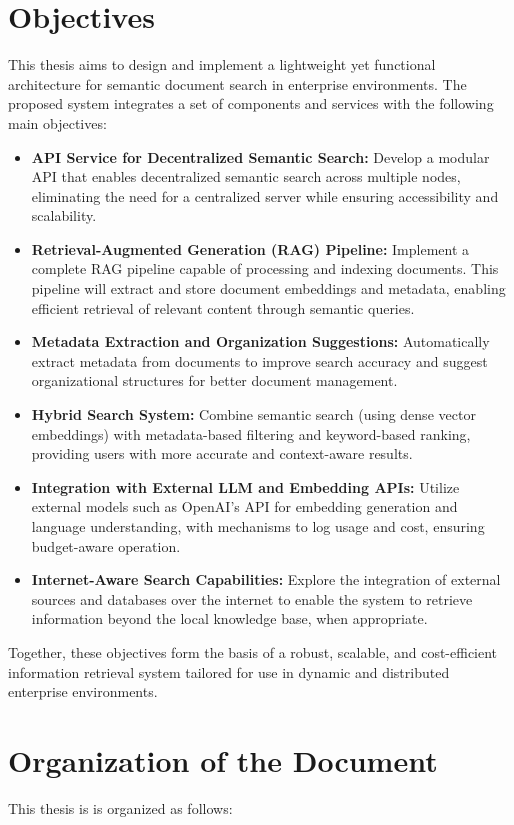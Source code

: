 \section{Objectives}
This thesis aims to design and implement a lightweight yet functional architecture for semantic document search in enterprise environments. The proposed system integrates a set of components and services with the following main objectives:
\begin{itemize}
\item \textbf{API Service for Decentralized Semantic Search:} Develop a modular API that enables decentralized semantic search across multiple nodes, eliminating the need for a centralized server while ensuring accessibility and scalability.
\item \textbf{Retrieval-Augmented Generation (RAG) Pipeline:} Implement a complete RAG pipeline capable of processing and indexing documents. This pipeline will extract and store document embeddings and metadata, enabling efficient retrieval of relevant content through semantic queries.
\item \textbf{Metadata Extraction and Organization Suggestions:} Automatically extract metadata from documents to improve search accuracy and suggest organizational structures for better document management.
\item \textbf{Hybrid Search System:} Combine semantic search (using dense vector embeddings) with metadata-based filtering and keyword-based ranking, providing users with more accurate and context-aware results.
\item \textbf{Integration with External LLM and Embedding APIs:} Utilize external models such as OpenAI’s API for embedding generation and language understanding, with mechanisms to log usage and cost, ensuring budget-aware operation.
\item \textbf{Internet-Aware Search Capabilities:} Explore the integration of external sources and databases over the internet to enable the system to retrieve information beyond the local knowledge base, when appropriate.
\end{itemize}
Together, these objectives form the basis of a robust, scalable, and cost-efficient information retrieval system tailored for use in dynamic and distributed enterprise environments.
\section{Organization of the Document}
This thesis is is organized as follows:  





